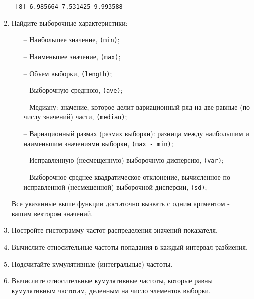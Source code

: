 \begin{enumerate}
		\indent \texttt{ [8]  6.985664  7.531425  9.993588}
	\item Найдите выборочные характеристики:
		\begin{itemize}
			\item[--] Наибольшее значение, \texttt{(min)};
			\item[--] Наименьшее значение, \texttt{(max)};
			\item[--] Объем выборки, \texttt{(length)};
			\item[--] Выборочную среднюю, \texttt{(ave)};
			\item[--] Медиану: значение, которое делит вариационный ряд на две равные (по числу значений) части, \texttt{(median)};
			\item[--] Вариационный размах (размах выборки): разница между наибольшим и наименьшим значениями выборки, \texttt{(max - min)}; 
			\item[--] Исправленную (несмещенную) выборочную дисперсию, \texttt{(var)};
			\item[--] Выборочное среднее квадратическое отклонение, вычисленное по исправленной (несмещенной) выборочной дисперсии, \texttt{(sd)};
		\end{itemize}
		Все указанные выше функции достаточно вызвать с одним аргментом - вашим вектором значений.
	\item Постройте гистограмму частот распределения значений показателя.
	\item Вычислите относительные частоты попадания в каждый интервал разбиения.
	\item Подсчитайте кумулятивные (интегральные) частоты.
	\item Вычислите относительные кумулятивные частоты, которые равны кумулятивным частотам, деленным на число элементов выборки.

\end{enumerate}
